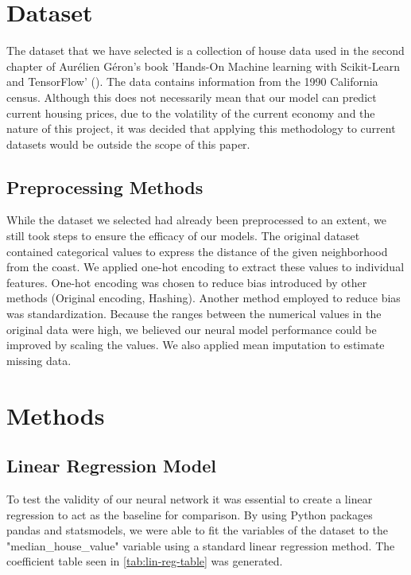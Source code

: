 \documentclass[11pt]{article}
\begin{document}
\section{Dataset}

The dataset that we have selected is a collection of house data used in the second chapter of Aurélien Géron's book 'Hands-On Machine learning with Scikit-Learn and TensorFlow' (\citeyear{Geron2022}). The data contains information from the 1990 California census. Although this does not necessarily mean that our model can predict current housing prices, due to the volatility of the current economy and the nature of this project, it was decided that applying this methodology to current datasets would be outside the scope of this paper.

\subsection{Preprocessing Methods}

While the dataset we selected had already been preprocessed to an extent, we still took steps to ensure the efficacy of our models. The original dataset contained categorical values to express the distance of the given neighborhood from the coast. 
We applied one-hot encoding to extract these values to individual features. One-hot encoding was chosen to reduce bias introduced by other methods (Original encoding, Hashing). Another method employed to reduce bias was standardization. Because the ranges between the numerical values in the original data were high, we believed our neural model performance could be improved by scaling the values. We also applied mean imputation to estimate missing data.


\section{Methods}

\subsection{Linear Regression Model}

To test the validity of our neural network it was essential to create a linear regression to act as the baseline for comparison. By using Python packages pandas and statsmodels, we were able to fit the variables of the dataset to the "median\_house\_value" variable using a standard linear regression method. The coefficient table seen in \autoref{tab:lin-reg-table} was generated.
\end{document}
